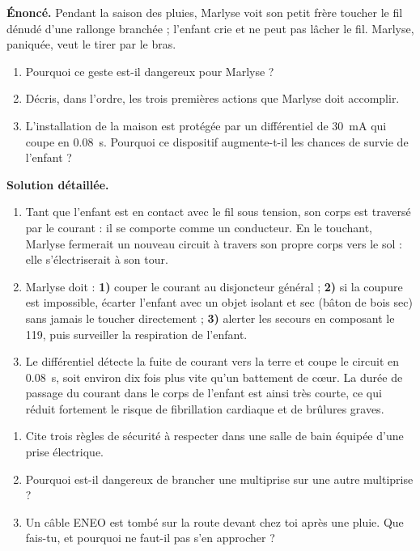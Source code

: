 \documentclass[11pt]{article}
\newcounter{popsec}
\newcounter{popsub}
\newcommand{\courssub}[1]{%
  \stepcounter{popsub}%
  \par\vspace{9pt}\noindent{\popxbold\fontsize{11.5}{13}\selectfont\color{popink}{\color{poporange}\thepopsec.\thepopsub}\hspace{6pt}#1}\par\nopagebreak\vspace{4pt}
}
\begin{document}
\courssub{Exercice résolu et bilan}

\begin{exoresolu}
\textbf{Énoncé.} Pendant la saison des pluies, Marlyse voit son petit frère toucher le fil dénudé d'une rallonge branchée ; l'enfant crie et ne peut pas lâcher le fil. Marlyse, paniquée, veut le tirer par le bras. 
\begin{enumerate}
\item Pourquoi ce geste est-il dangereux pour Marlyse ?
\item Décris, dans l'ordre, les trois premières actions que Marlyse doit accomplir.
\item L'installation de la maison est protégée par un différentiel de \SI{30}{mA} qui coupe en \SI{0,08}{s}. Pourquoi ce dispositif augmente-t-il les chances de survie de l'enfant ?
\end{enumerate}
\tcblower
\textbf{Solution détaillée.}
\begin{enumerate}
\item Tant que l'enfant est en contact avec le fil sous tension, son corps est traversé par le courant : il se comporte comme un conducteur. En le touchant, Marlyse fermerait un nouveau circuit à travers son propre corps vers le sol : elle s'électriserait à son tour.
\item Marlyse doit : \textbf{1)} couper le courant au disjoncteur général ; \textbf{2)} si la coupure est impossible, écarter l'enfant avec un objet isolant et sec (bâton de bois sec) sans jamais le toucher directement ; \textbf{3)} alerter les secours en composant le 119, puis surveiller la respiration de l'enfant.
\item Le différentiel détecte la fuite de courant vers la terre et coupe le circuit en \SI{0,08}{s}, soit environ dix fois plus vite qu'un battement de cœur. La durée de passage du courant dans le corps de l'enfant est ainsi très courte, ce qui réduit fortement le risque de fibrillation cardiaque et de brûlures graves.
\end{enumerate}
\end{exoresolu}

\begin{exercice}
\begin{enumerate}
\item Cite trois règles de sécurité à respecter dans une salle de bain équipée d'une prise électrique.
\item Pourquoi est-il dangereux de brancher une multiprise sur une autre multiprise ?
\item Un câble ENEO est tombé sur la route devant chez toi après une pluie. Que fais-tu, et pourquoi ne faut-il pas s'en approcher ?
\end{enumerate}
\end{exercice}
\end{document}

